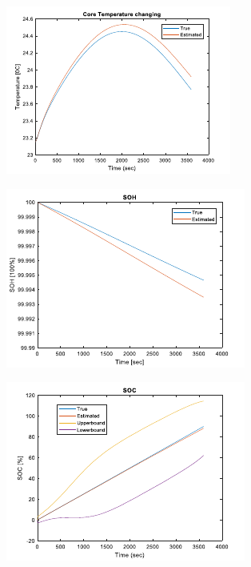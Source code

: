 \documentclass[12pt]{article}
\begin{document}
\begin{figure}[H]
\begin{subfigure}[t]{0.3\linewidth}
		\includegraphics[width=\linewidth]{figures/estVoltPar3.pdf}
	\end{subfigure}
	\begin{subfigure}[t]{0.3\linewidth}
		\includegraphics[width=\linewidth]{figures/estVoltPar4.pdf}
	\end{subfigure}	
	\begin{subfigure}[t]{0.3\linewidth}
		\includegraphics[width=\linewidth]{figures/estVoltPar5.pdf}

\end{subfigure}
\end{figure}
\end{document}
